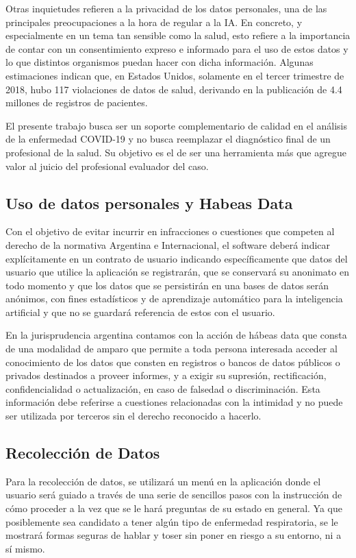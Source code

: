 \documentclass[journal]{IEEEtran}
\begin{document}
Otras inquietudes refieren a la privacidad de los datos personales, una de las principales preocupaciones a la hora de regular a la IA. En concreto, y especialmente en un tema tan sensible como la salud, esto refiere a la importancia de contar con un consentimiento expreso e informado para el uso de estos datos y lo que distintos organismos puedan hacer con dicha información. Algunas estimaciones indican que, en Estados Unidos, solamente en el tercer trimestre de 2018, hubo 117 violaciones de datos de salud, derivando en la publicación de 4.4 millones de registros de pacientes\cite{inteligencia-artificial-en-salud}.

El presente trabajo busca ser un soporte complementario de calidad en el análisis de la enfermedad COVID-19 y no busca reemplazar el diagnóstico final de un profesional de la salud. Su objetivo es el de ser una herramienta más que agregue valor al juicio del profesional evaluador del caso.

\subsection{Uso de datos personales y Habeas Data}
Con el objetivo de evitar incurrir en infracciones o cuestiones que competen al derecho de la normativa Argentina e Internacional, el software deberá indicar explícitamente en un contrato de usuario indicando específicamente que datos del usuario que utilice la aplicación se registrarán, que se conservará su anonimato en todo momento y que los datos que se persistirán en una bases de datos serán anónimos, con fines estadísticos y de aprendizaje automático para la inteligencia artificial y que no se guardará referencia de estos con el usuario.

En la jurisprudencia argentina contamos con la acción de hábeas data que consta de una modalidad de amparo que permite a toda persona interesada acceder al conocimiento de los datos que consten en registros o bancos de datos públicos o privados destinados a proveer informes, y a exigir su supresión, rectificación, confidencialidad o actualización, en caso de falsedad o discriminación. Esta información debe referirse a cuestiones relacionadas con la intimidad y no puede ser utilizada por terceros sin el derecho reconocido a hacerlo\cite{habeas-data}.

\subsection{Recolección de Datos}
Para la recolección de datos, se utilizará un menú en la aplicación donde el usuario será guiado a través de una serie de sencillos pasos con la instrucción de cómo proceder a la vez que se le hará preguntas de su estado en general. Ya que posiblemente sea candidato a tener algún tipo de enfermedad respiratoria, se le mostrará formas seguras de hablar y toser sin poner en riesgo a su entorno, ni a sí mismo\cite{tp}.
\end{document}
